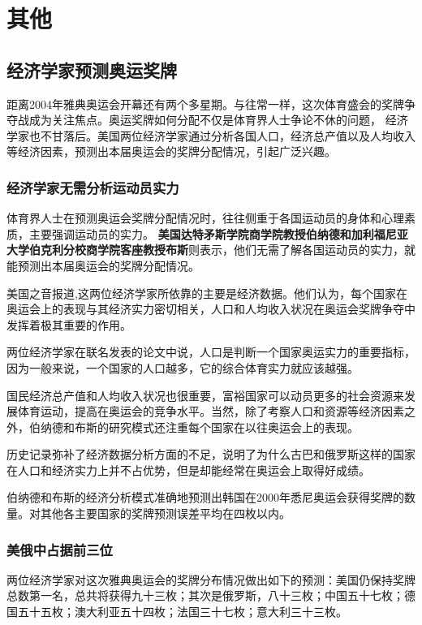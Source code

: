 \chapter{其他}

\section{经济学家预测奥运奖牌}
距离2004年雅典奥运会开幕还有两个多星期。与往常一样，这次体育盛会的奖牌争夺战成为关注焦点。奥运奖牌如何分配不仅是体育界人士争论不休的问题，
经济学家也不甘落后。美国两位经济学家通过分析各国人口，经济总产值以及人均收入等经济因素，预测出本届奥运会的奖牌分配情况，引起广泛兴趣。 
	
\subsection{经济学家无需分析运动员实力}
体育界人士在预测奥运会奖牌分配情况时，往往侧重于各国运动员的身体和心理素质，主要强调运动员的实力。
\textbf{美国达特矛斯学院商学院教授伯纳德和加利福尼亚大学伯克利分校商学院客座教授布斯}则表示，他们无需了解各国运动员的实力，就能预测出本届奥运会的奖牌分配情况。 
	
美国之音报道,这两位经济学家所依靠的主要是经济数据。他们认为，每个国家在奥运会上的表现与其经济实力密切相关，人口和人均收入状况在奥运会奖牌争夺中发挥着极其重要的作用。 
	
两位经济学家在联名发表的论文中说，人口是判断一个国家奥运实力的重要指标，因为一般来说，一个国家的人口越多，它的综合体育实力就应该越强。 
	
国民经济总产值和人均收入状况也很重要，富裕国家可以动员更多的社会资源来发展体育运动，提高在奥运会的竞争水平。当然，除了考察人口和资源等经济因素之外，伯纳德和布斯的研究模式还注重每个国家在以往奥运会上的表现。 
	
历史记录弥补了经济数据分析方面的不足，说明了为什么古巴和俄罗斯这样的国家在人口和经济实力上并不占优势，但是却能经常在奥运会上取得好成绩。 
	
伯纳德和布斯的经济分析模式准确地预测出韩国在2000年悉尼奥运会获得奖牌的数量。对其他各主要国家的奖牌预测误差平均在四枚以内。
	
\subsection{美俄中占据前三位}
两位经济学家对这次雅典奥运会的奖牌分布情况做出如下的预测：美国仍保持奖牌总数第一名，总共将获得九十三枚；其次是俄罗斯，八十三枚；中国五十七枚；德国五十五枚；澳大利亚五十四枚；法国三十七枚；意大利三十三枚。
	
